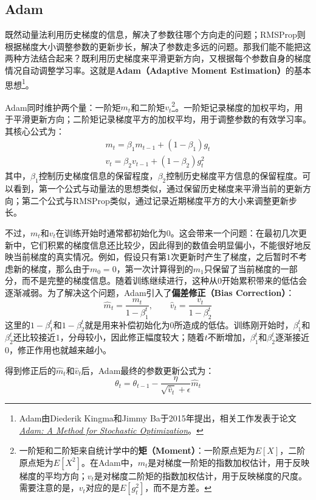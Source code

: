 \subsection{Adam}

既然动量法利用历史梯度的信息，解决了参数往哪个方向走的问题；RMSProp则根据梯度大小调整参数的更新步长，解决了参数走多远的问题。那我们能不能把这两种方法结合起来？既利用历史梯度来平滑更新方向，又根据每个参数自身的梯度情况自动调整学习率。这就是\textbf{Adam（Adaptive Moment Estimation）}的基本思想\footnote{Adam由Diederik Kingma和Jimmy Ba于2015年提出，相关工作发表于论文\href{https://arxiv.org/abs/1412.6980}{\textit{Adam: A Method for Stochastic Optimization}}。}。

Adam同时维护两个量：一阶矩$m_t$和二阶矩$v_t$\footnote{一阶矩和二阶矩来自统计学中的\textbf{矩（Moment）}：一阶原点矩为$E[X]$，二阶原点矩为$E[X^2]$。在Adam中，$m_t$是对梯度一阶矩的指数加权估计，用于反映梯度的平均方向；$v_t$是对梯度二阶矩的指数加权估计，用于反映梯度的尺度。需要注意的是，$v_t$对应的是$E[g_t^2]$，而不是方差。}。一阶矩记录梯度的加权平均，用于平滑更新方向；二阶矩记录梯度平方的加权平均，用于调整参数的有效学习率。其核心公式为：
$$
\begin{gathered}
m_t = \beta_1 m_{t-1} + (1-\beta_1)g_t \\
v_t = \beta_2 v_{t-1} + (1-\beta_2)g_t^2
\end{gathered}
$$
其中，$\beta_1$控制历史梯度信息的保留程度，$\beta_2$控制历史梯度平方信息的保留程度。可以看到，第一个公式与动量法的思想类似，通过保留历史梯度来平滑当前的更新方向；第二个公式与RMSProp类似，通过记录近期梯度平方的大小来调整更新步长。

不过，$m_t$和$v_t$在训练开始时通常都初始化为$0$。这会带来一个问题：在最初几次更新中，它们积累的梯度信息还比较少，因此得到的数值会明显偏小，不能很好地反映当前梯度的真实情况。例如，假设只有第$1$次更新时产生了梯度，之后暂时不考虑新的梯度，那么由于$m_0=0$，第一次计算得到的$m_1$只保留了当前梯度的一部分，而不是完整的梯度信息。随着训练继续进行，这种从$0$开始累积带来的低估会逐渐减弱。为了解决这个问题，Adam引入了\textbf{偏差修正（Bias Correction）}：
$$
\hat{m}_t = \frac{m_t}{1-\beta_1^t}, \qquad \hat{v}_t = \frac{v_t}{1-\beta_2^t}
$$
这里的$1-\beta_1^t$和$1-\beta_2^t$就是用来补偿初始化为$0$所造成的低估。训练刚开始时，$\beta_1^t$和$\beta_2^t$还比较接近$1$，分母较小，因此修正幅度较大；随着$t$不断增加，$\beta_1^t$和$\beta_2^t$逐渐接近$0$，修正作用也就越来越小。

得到修正后的$\hat m_t$和$\hat v_t$后，Adam最终的参数更新公式为：
$$
\theta_t = \theta_{t-1} - \frac{\eta}{\sqrt{\hat{v}_t}+\epsilon}\hat{m}_t
$$

